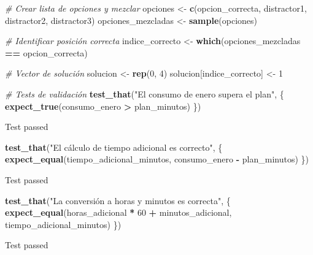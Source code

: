 \documentclass[
]{article}
\newenvironment{Shaded}{\begin{snugshade}}{\end{snugshade}}
\newcommand{\CommentTok}[1]{\textcolor[rgb]{0.56,0.35,0.01}{\textit{#1}}}
\newcommand{\DecValTok}[1]{\textcolor[rgb]{0.00,0.00,0.81}{#1}}
\newcommand{\FunctionTok}[1]{\textcolor[rgb]{0.13,0.29,0.53}{\textbf{#1}}}
\newcommand{\NormalTok}[1]{#1}
\newcommand{\OtherTok}[1]{\textcolor[rgb]{0.56,0.35,0.01}{#1}}
\newcommand{\SpecialCharTok}[1]{\textcolor[rgb]{0.81,0.36,0.00}{\textbf{#1}}}
\newcommand{\StringTok}[1]{\textcolor[rgb]{0.31,0.60,0.02}{#1}}
\begin{document}
\begin{Shaded}
\begin{Highlighting}[]
\CommentTok{\# Crear lista de opciones y mezclar}
\NormalTok{opciones }\OtherTok{\textless{}{-}} \FunctionTok{c}\NormalTok{(opcion\_correcta, distractor1, distractor2, distractor3)}
\NormalTok{opciones\_mezcladas }\OtherTok{\textless{}{-}} \FunctionTok{sample}\NormalTok{(opciones)}

\CommentTok{\# Identificar posición correcta}
\NormalTok{indice\_correcto }\OtherTok{\textless{}{-}} \FunctionTok{which}\NormalTok{(opciones\_mezcladas }\SpecialCharTok{==}\NormalTok{ opcion\_correcta)}

\CommentTok{\# Vector de solución}
\NormalTok{solucion }\OtherTok{\textless{}{-}} \FunctionTok{rep}\NormalTok{(}\DecValTok{0}\NormalTok{, }\DecValTok{4}\NormalTok{)}
\NormalTok{solucion[indice\_correcto] }\OtherTok{\textless{}{-}} \DecValTok{1}

\CommentTok{\# Tests de validación}
\FunctionTok{test\_that}\NormalTok{(}\StringTok{"El consumo de enero supera el plan"}\NormalTok{, \{}
  \FunctionTok{expect\_true}\NormalTok{(consumo\_enero }\SpecialCharTok{\textgreater{}}\NormalTok{ plan\_minutos)}
\NormalTok{\})}
\end{Highlighting}
\end{Shaded}

Test passed

\begin{Shaded}
\begin{Highlighting}[]
\FunctionTok{test\_that}\NormalTok{(}\StringTok{"El cálculo de tiempo adicional es correcto"}\NormalTok{, \{}
  \FunctionTok{expect\_equal}\NormalTok{(tiempo\_adicional\_minutos, consumo\_enero }\SpecialCharTok{{-}}\NormalTok{ plan\_minutos)}
\NormalTok{\})}
\end{Highlighting}
\end{Shaded}

Test passed

\begin{Shaded}
\begin{Highlighting}[]
\FunctionTok{test\_that}\NormalTok{(}\StringTok{"La conversión a horas y minutos es correcta"}\NormalTok{, \{}
  \FunctionTok{expect\_equal}\NormalTok{(horas\_adicional }\SpecialCharTok{*} \DecValTok{60} \SpecialCharTok{+}\NormalTok{ minutos\_adicional, tiempo\_adicional\_minutos)}
\NormalTok{\})}
\end{Highlighting}
\end{Shaded}

Test passed
\end{document}
